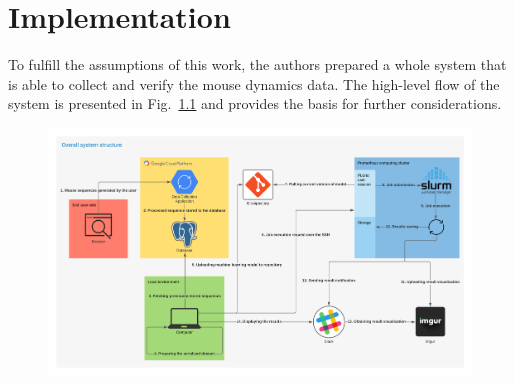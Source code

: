 \chapter{Implementation}\label{ch:implementation}
To fulfill the assumptions of this work, the authors prepared a whole system that is able to collect and verify the mouse dynamics data.
The high-level flow of the system is presented in Fig.~\ref{fig:overall_system_structure} and provides the basis for further considerations.
\begin{figure}[!hbt]
    \includegraphics[width=\linewidth]{resources/overall_system_structure}
    \label{fig:overall_system_structure}
\end{figure}

